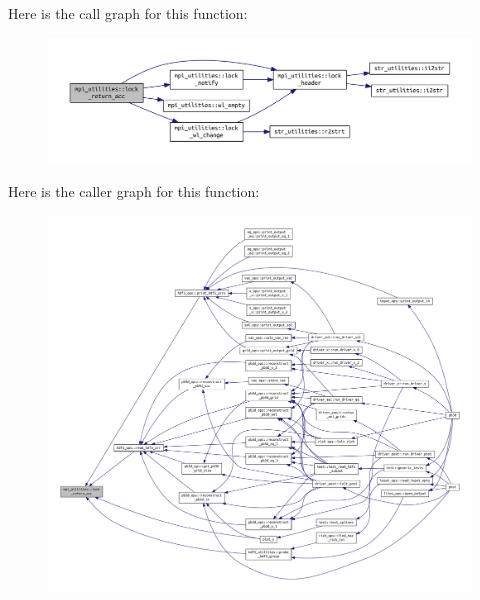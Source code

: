 Here is the call graph for this function\+:\nopagebreak
\begin{figure}[H]
\begin{center}
\leavevmode
\includegraphics[width=350pt]{namespacempi__utilities_a86f9982a0f92b51a916f832d9a3d8ba9_cgraph}
\end{center}
\end{figure}
Here is the caller graph for this function\+:\nopagebreak
\begin{figure}[H]
\begin{center}
\leavevmode
\includegraphics[width=350pt]{namespacempi__utilities_a86f9982a0f92b51a916f832d9a3d8ba9_icgraph}
\end{center}
\end{figure}
\mbox{\label{namespacempi__utilities_a3b0349e5ec825e14083e3126c3e7ba65}} 
